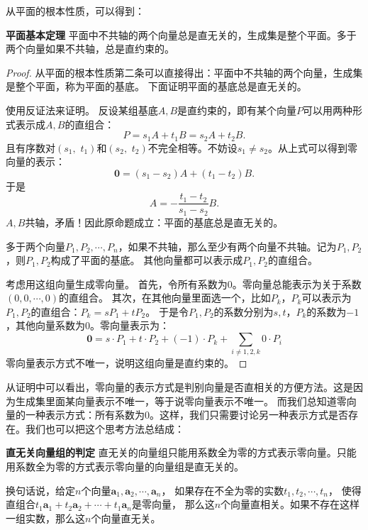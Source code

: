 \documentclass[12pt,UTF8]{ctexbook}
\begin{document}
从平面的根本性质，可以得到：
\begin{tm}{\textbf{平面基本定理}}\label{tm:0-0-20}
    平面中不共轴的两个向量总是直无关的，生成集是整个平面。多于两个向量如果不共轴，总是直约束的。
\end{tm}
\begin{proof}
    从平面的根本性质第二条可以直接得出：平面中不共轴的两个向量，生成集是整个平面，称为平面的基底。
    下面证明平面的基底总是直无关的。
    
    使用反证法来证明。
    反设某组基底$A,B$是直约束的，即有某个向量$P$可以用两种形式表示成$A,B$的直组合：
    $$ P = s_1A + t_1B = s_2A + t_2B. $$
    且有序数对$(s_1, \,\,t_1)$和$(s_2, \,\,t_2)$不完全相等。不妨设$s_1 \neq s_2$。从上式可以得到零向量的表示：
    $$ \mathbf{0} = (s_1 - s_2)A + (t_1 - t_2)B.$$
    于是
    $$ A = -\frac{t_1 - t_2}{s_1 - s_2} B.$$
    $A, B$共轴，矛盾！因此原命题成立：平面的基底总是直无关的。

    多于两个向量$P_1, P_2, \cdots , P_n$，如果不共轴，那么至少有两个向量不共轴。记为$P_1, P_2$，则$P_1, P_2$构成了平面的基底。
    其他向量都可以表示成$P_1, P_2$的直组合。
    
    考虑用这组向量生成零向量。
    首先，令所有系数为$0$。零向量总能表示为关于系数$(0,0,\cdots,0)$的直组合。
    其次，在其他向量里面选一个，比如$P_k$，$P_k$可以表示为$P_1, P_2$的直组合：$P_k = sP_1 + tP_2$。
    于是令$P_1,P_2$的系数分别为$s,t$，$P_k$的系数为$-1$，其他向量系数为$0$。零向量表示为：
    $$ \mathbf{0} = s\cdot P_1 + t\cdot P_2 + (-1)\cdot P_k + \sum_{i\neq 1,2,k} 0\cdot P_i$$
    零向量表示方式不唯一，说明这组向量是直约束的。
\end{proof}

从证明中可以看出，零向量的表示方式是判别向量是否直相关的方便方法。这是因为生成集里面某向量表示不唯一，等于说零向量表示不唯一。
而我们总知道零向量的一种表示方式：所有系数为$0$。这样，我们只需要讨论另一种表示方式是否存在。我们也可以把这个思考方法总结成：

\begin{tm}{\textbf{直无关向量组的判定}}\label{tm:0-0-25}
    直无关的向量组只能用系数全为零的方式表示零向量。只能用系数全为零的方式表示零向量的向量组是直无关的。
\end{tm}

换句话说，给定$n$个向量$\mathbf{a}_1, \mathbf{a}_2, \cdots , \mathbf{a}_n$，
如果存在不全为零的实数$t_1, t_2, \cdots , t_n$，
使得直组合$t_1\mathbf{a}_1 + t_2\mathbf{a}_2 + \cdots + t_1\mathbf{a}_n$是零向量，
那么这$n$个向量直相关。如果不存在这样一组实数，那么这$n$个向量直无关。
\end{document}
